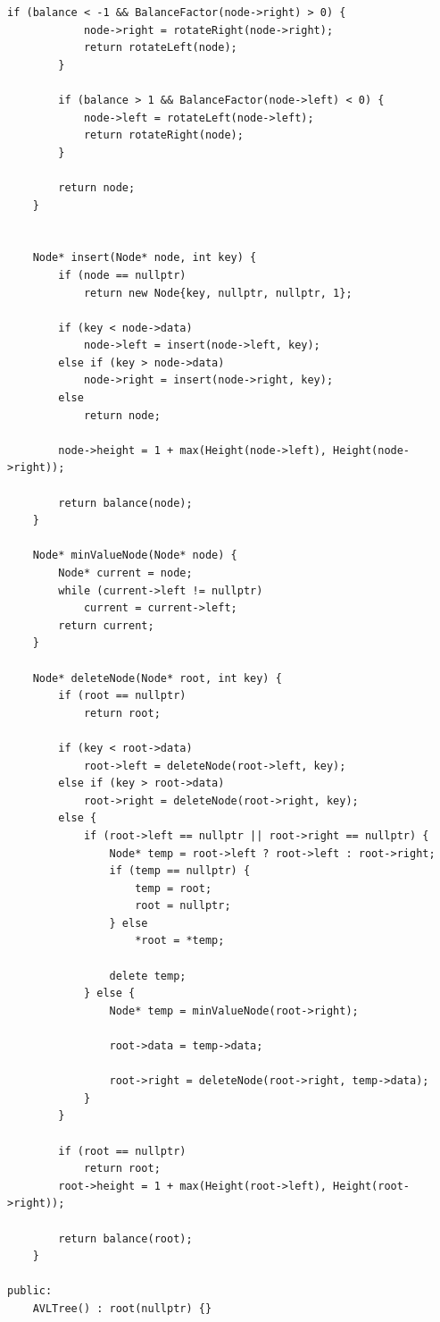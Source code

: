 \documentclass[12pt, a4paper]{article}
\begin{document}
\begin{lstlisting}[caption={Исходный код}, label={lst:label1}]
        if (balance < -1 && BalanceFactor(node->right) > 0) {
            node->right = rotateRight(node->right);
            return rotateLeft(node);
        }

        if (balance > 1 && BalanceFactor(node->left) < 0) {
            node->left = rotateLeft(node->left);
            return rotateRight(node);
        }

        return node;
    }
    

    Node* insert(Node* node, int key) {
        if (node == nullptr)
            return new Node{key, nullptr, nullptr, 1};

        if (key < node->data)
            node->left = insert(node->left, key);
        else if (key > node->data)
            node->right = insert(node->right, key);
        else
            return node;

        node->height = 1 + max(Height(node->left), Height(node->right));

        return balance(node);
    }

    Node* minValueNode(Node* node) {
        Node* current = node;
        while (current->left != nullptr)
            current = current->left;
        return current;
    }

    Node* deleteNode(Node* root, int key) {
        if (root == nullptr)
            return root;

        if (key < root->data)
            root->left = deleteNode(root->left, key);
        else if (key > root->data)
            root->right = deleteNode(root->right, key);
        else {
            if (root->left == nullptr || root->right == nullptr) {
                Node* temp = root->left ? root->left : root->right;
                if (temp == nullptr) {
                    temp = root;
                    root = nullptr;
                } else
                    *root = *temp;

                delete temp;
            } else {
                Node* temp = minValueNode(root->right);

                root->data = temp->data;

                root->right = deleteNode(root->right, temp->data);
            }
        }

        if (root == nullptr)
            return root;
        root->height = 1 + max(Height(root->left), Height(root->right));

        return balance(root);
    }

public:
    AVLTree() : root(nullptr) {}


\end{lstlisting}
\end{document}
